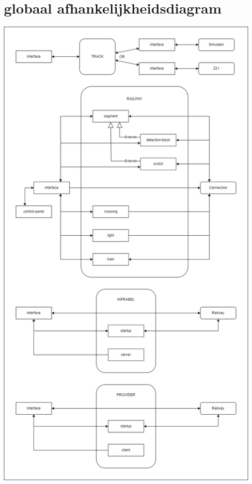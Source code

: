 \documentclass[a4paper, 11pt]{article}
\newcommand{\<}{\scriptsize\textless\normalsize}
\renewcommand{\>}{\scriptsize\textgreater\normalsize}
\begin{document}
\section{globaal afhankelijkheidsdiagram} %
\begin{center}
	\includegraphics[scale=.45]{Afhankelijkheidsdiagrammen/global.png}
\end{center}
\end{document}
